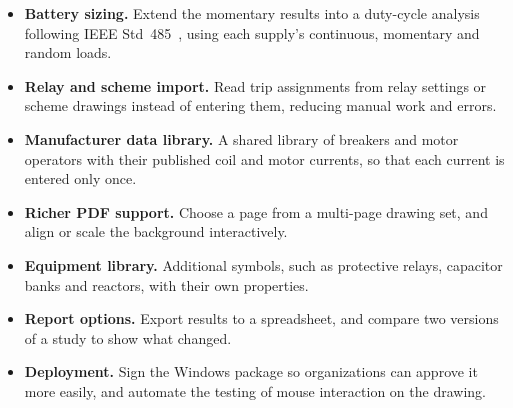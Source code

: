 \begin{itemize}
  \item \textbf{Battery sizing.} Extend the momentary results into a duty-cycle
        analysis following IEEE Std~485~\cite{ieee485}, using each supply's continuous,
        momentary and random loads.
  \item \textbf{Relay and scheme import.} Read trip assignments from relay settings or
        scheme drawings instead of entering them, reducing manual work and errors.
  \item \textbf{Manufacturer data library.} A shared library of breakers and motor
        operators with their published coil and motor currents, so that each current is
        entered only once.
  \item \textbf{Richer PDF support.} Choose a page from a multi-page drawing set, and
        align or scale the background interactively.
  \item \textbf{Equipment library.} Additional symbols, such as protective relays,
        capacitor banks and reactors, with their own properties.
  \item \textbf{Report options.} Export results to a spreadsheet, and compare two
        versions of a study to show what changed.
  \item \textbf{Deployment.} Sign the Windows package so organizations can approve it
        more easily, and automate the testing of mouse interaction on the drawing.
\end{itemize}
